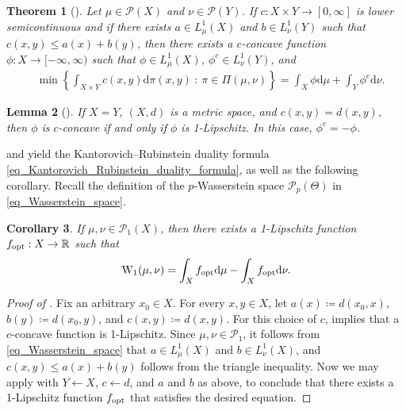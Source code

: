 \documentclass[a4paper]{scrartcl}
\newtheorem{theorem}{Theorem}[section]
\newtheorem{corollary}[theorem]{Corollary}
\newtheorem{lemma}[theorem]{Lemma}
\theoremstyle{definition}
\numberwithin{equation}{section}
\newcommand{\R}{\mathbb{R}}
\newcommand{\rd}{\mathrm{d}}
\newcommand{\Was}[0]{\textup{W}}
\newcommand{\opt}[0]{\textup{opt}}
\begin{document}
\begin{theorem}[{\cite[Theorem 4.2(ii)]{Ambrosio2021}}]
\label{theorem_Ambrosio_4_2}
 Let $\mu\in\mathcal{P}(X)$ and $\nu\in\mathcal{P}(Y)$. If $c:X\times Y\to [0,\infty]$ is lower semicontinuous and if there exists $a\in L^1_\mu(X)$ and $b\in L^1_\nu(Y)$ such that $c(x,y)\leq a(x)+b(y)$, then there exists a $c$-concave function $\phi:X\to [-\infty,\infty)$ such that $\phi\in L^1_\mu(X)$, $\phi^c\in L^1_\nu(Y)$, and 
 \begin{align*}
  &\min\left\{\int_{X\times Y} c(x,y)\rd \pi(x,y)\ :\ \pi\in\Pi(\mu,\nu)\right\}=\int_X \phi\rd \mu+\int_Y \phi^c\rd\nu.
 \end{align*}
\end{theorem}
\begin{lemma}[{\cite[pp.39-40]{Ambrosio2021}}]
 \label{lemma_c_concavity_for_specific_costs}
If $X=Y$, $(X,d)$ is a metric space, and $c(x,y)=d(x,y)$, then $\phi$ is $c$-concave if and only if $\phi$ is 1-Lipschitz. In this case, $\phi^c=-\phi$.
\end{lemma}
 and  yield the Kantorovich--Rubinstein duality formula \eqref{eq_Kantorovich_Rubinstein_duality_formula}, as well as the following corollary.
Recall the definition of the $p$-Wasserstein space $\mathcal{P}_p(\Theta)$ in \eqref{eq_Wasserstein_space}.
\begin{corollary}
 \label{corollary_attainment_of_supremum_in_Kantorovich_Duality}
 If $\mu,\nu\in\mathcal{P}_1(X)$, then there exists a 1-Lipschitz function $f_\opt:X\to\R$ such that
 \begin{equation*}
 \Was_1(\mu,\nu)  =\int_X f_\opt \rd \mu-\int_X f_\opt \rd \nu.
 \end{equation*}
\end{corollary}
\begin{proof}[Proof of ]
 Fix an arbitrary $x_0\in X$.
 For every $x,y\in X$, let $a(x)\coloneqq d(x_0,x)$, $b(y)\coloneqq  d(x_0,y)$, and $c(x,y)\coloneqq d(x,y)$.
For this choice of $c$,  implies that a $c$-concave function is 1-Lipschitz.
Since $\mu,\nu\in\mathcal{P}_1$, it follows from \eqref{eq_Wasserstein_space} that $a\in L^1_\mu(X)$ and $b\in L^1_\nu(X)$, and $c(x,y)\leq a(x)+b(y)$ follows from the triangle inequality. 
Now we may apply  with $Y\leftarrow X$, $c\leftarrow d$, and $a$ and $b$ as above, to conclude that there exists a 1-Lipschitz function $f_\opt$ that satisfies the desired equation.
\end{proof}
\end{document}
